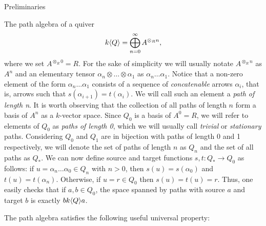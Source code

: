 \begin{chapter}{Preliminaries}
\begin{section}{The path algebra of a quiver}
\[
k\langle Q\rangle = \bigoplus_{n=0}^\infty A^{\otimes_R n},
\]
where we set $A^{\otimes_R 0}=R$. For the sake of simplicity we will usually notate $A^{\otimes_R n}$ as $A^n$ and an elementary tensor $\alpha_n\otimes\dots\otimes \alpha_1$ as $\alpha_n\dots\alpha_1$. Notice that a non-zero element of the form $\alpha_n\dots\alpha_1$ consists of a sequence of \emph{concatenable} arrows $\alpha_i$, that is, arrows such that $s(\alpha_{i+1})=t(\alpha_i)$. We will call such an element a \emph{path of length n}. It is worth observing that the collection of all paths of length $n$ form a basis of $A^n$ as a $k$-vector space. Since $Q_0$ is a basis of $A^0=R$, we will refer to elements of $Q_0$ as \emph{paths of length 0}, which we will usually call \emph{trivial} or \emph{stationary} paths. Considering $Q_0$ and $Q_1$ are in bijection with paths of length 0 and 1 respectively, we will denote the set of paths of length $n$ as $Q_n$ and the set of all paths as $Q_*$. We can now define source and target functions $s,t:Q_*\to Q_0$ as follows: if $u=\alpha_n\dots\alpha_0\in Q_n$ with $n>0$, then $s(u)=s(\alpha_0)$ and $t(u)=t(\alpha_n)$. Otherwise, if $u=r\in Q_0$ then $s(u)=t(u)=r$. Thus, one easily checks that if $a,b\in Q_0$, the space spanned by paths with source $a$ and target $b$ is exactly $bk\langle Q\rangle a$.

The path algebra satisfies the following useful universal property:


\end{section}
\end{chapter}
